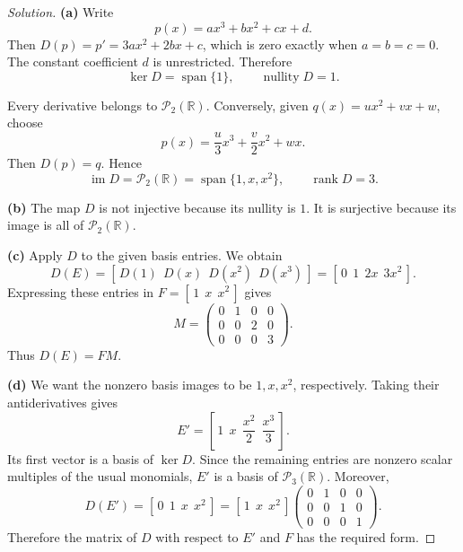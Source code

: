 \begin{proof}[Solution]
  \textbf{(a)} Write
    \[
      p(x)=ax^3+bx^2+cx+d.
    \]
    Then \(D(p)=p'=3ax^2+2bx+c\), which is zero exactly when
    \(a=b=c=0\). The constant coefficient \(d\) is unrestricted.
    Therefore
    \[
      \ker D=\operatorname{span}\{1\},
      \qquad
      \operatorname{nullity}D=1.
    \]

    Every derivative belongs to \(\mathcal P_2(\mathbb{R})\). Conversely, given
    \(q(x)=ux^2+vx+w\), choose
    \[
      p(x)=\frac{u}{3}x^3+\frac{v}{2}x^2+wx.
    \]
    Then \(D(p)=q\). Hence
    \[
      \operatorname{im}D=\mathcal P_2(\mathbb{R})
        =\operatorname{span}\{1,x,x^2\},
      \qquad
      \operatorname{rank}D=3.
    \]

  \textbf{(b)} The map \(D\) is not injective because its nullity is \(1\).
    It is surjective because its image is all of \(\mathcal P_2(\mathbb{R})\).

  \textbf{(c)} Apply \(D\) to the given basis entries. We obtain
    \[
      D(E)=[\,D(1)\ \ D(x)\ \ D(x^2)\ \ D(x^3)\,]
        =[\,0\ \ 1\ \ 2x\ \ 3x^2\,].
    \]
    Expressing these entries in \(F=[\,1\ \ x\ \ x^2\,]\) gives
    \[
      M=
      \begin{pmatrix}
        0&1&0&0\\
        0&0&2&0\\
        0&0&0&3
      \end{pmatrix}.
    \]
    Thus \(D(E)=FM\).

  \textbf{(d)} We want the nonzero basis images to be \(1,x,x^2\), respectively.
    Taking their antiderivatives gives
    \[
      E'=\left[\,1\ \ x\ \ \frac{x^2}{2}\ \ \frac{x^3}{3}\,\right].
    \]
    Its first vector is a basis of \(\ker D\). Since the remaining
    entries are nonzero scalar multiples of the usual monomials,
    \(E'\) is a basis of \(\mathcal P_3(\mathbb{R})\). Moreover,
    \[
      D(E')=[\,0\ \ 1\ \ x\ \ x^2\,]
        =[\,1\ \ x\ \ x^2\,]
          \begin{pmatrix}
            0&1&0&0\\
            0&0&1&0\\
            0&0&0&1
          \end{pmatrix}.
    \]
    Therefore the matrix of \(D\) with respect to \(E'\) and \(F\) has
    the required form.
\end{proof}
